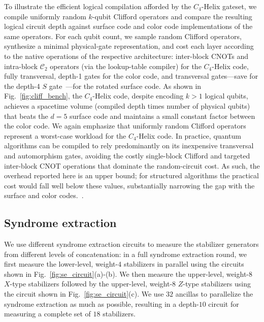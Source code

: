 To illustrate the efficient logical compilation afforded by the $C_4$-Helix gateset, we compile uniformly random $k$-qubit Clifford operators and compare the resulting logical circuit depth against surface code and color code implementations of the same operators. For each qubit count, we sample random Clifford operators, synthesize a minimal physical-gate representation, and cost each layer according to the native operations of the respective architecture: inter-block CNOTs and intra-block $\mathcal{C}_2$ operators (via the lookup-table compiler) for the $C_4$-Helix code, fully transversal, depth-1 gates for the color code, and transversal gates---save for the depth-4 $S$ gate~\cite{chen2026}---for the rotated surface code. As shown in Fig.~\ref{fig:cliff_bench}, the $C_4$-Helix code, despite encoding $k>1$ logical qubits, achieves a spacetime volume (compiled depth times number of physical qubits) that beats the $d=5$ surface code and maintains a small constant factor between the color code. We again emphasize that uniformly random Clifford operators represent a worst-case workload for the $C_4$-Helix code. In practice, quantum algorithms can be compiled to rely predominantly on its inexpensive transversal and automorphism gates, avoiding the costly single-block Clifford and targeted inter-block CNOT operations that dominate the random-circuit cost. As such, the overhead reported here is an upper bound; for structured algorithms the practical cost would fall well below these values, substantially narrowing the gap with the surface and color codes.~\cite{LeBlond2026InPrep}.



\subsection{Syndrome extraction}
\label{apx:syndrome_extraction}

We use different syndrome extraction circuits to measure the stabilizer generators from different levels of concatenation: in a full syndrome extraction round, we first measure the lower-level, weight-$4$ stabilizers in parallel using the circuits shown in Fig.~\ref{fig:se_circuit}(a)-(b). We then measure the upper-level, weight-$8$ $X$-type stabilizers followed by the upper-level, weight-8 $Z$-type stabilizers using the circuit shown in Fig.~\ref{fig:se_circuit}(c). We use $32$ ancillas to parallelize the syndrome extraction as much as possible, resulting in a depth-$10$ circuit for measuring a complete set of $18$ stabilizers. 

